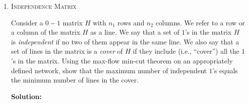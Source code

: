 \documentclass[11pt]{article}
\begin{document}
\begin{enumerate}
    {\bf Solution:}
    
    The deterministic algorithm consists of picking any pair
    of vertices $(s,t)$, and computing the minimum cut that
    have $s$ on one side, and $t$ on the other. Here, we
    take every edge and replicate it twice, in both
    directions, and assign every edge weight one. We next
    compute the maximum flow between $s$ and $t$. Clearly,
    by the min-cut max flow, one of the cut we would compute
    is the minimum cut in the graph. 

    The running time of this algorithm is not exciting. In
    the worst case, it would take $O(m^2n \cdot n^2) =
    O(n^8)$ time. This is much worse than the randomized
    algorithm, that takes roughly $O(n^2 \log^3 n )$ time.
    

    \item \textsc{Independence Matrix}\\
    
    Consider a $0-1$ matrix $H$ with $n_1$ rows and $n_2$
    columns. We refer to a row or a column of the matrix $H$
    as a line. We say that a set of $1$'s in the matrix $H$
    is \emph{independent} if no two of them appear in the
    same line. We also say that a set of lines in the matrix
    is a \emph{cover} of $H$ if they include (i.e.,
    ``cover'') all the $1$'s in the matrix. Using the
    max-flow min-cut theorem on an appropriately defined
    network, show that the maximum number of independent
    $1$'s equals the minimum number of lines in the cover.
    
    {\bf Solution:}
    

\end{enumerate}
\end{document}
